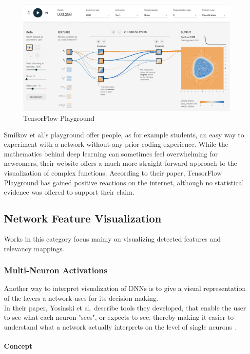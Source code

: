 \documentclass{acmsiggraph}               %
\newcommand{\paragraphbr}[1]{\paragraph{#1}\mbox{}\\}
\begin{document}
\begin{figure}
\includegraphics[width=\textwidth]{tensorflow_playground_smilkov_et_al}
\caption{TensorFlow Playground \protect\cite{Smilkov2017}}
\label{fig:tensorflow_playground}
\centering
\end{figure}

Smilkov et al.'s playground offer people, as for example students, an easy way to experiment with a network without any prior coding experience. While the mathematics behind deep learning can sometimes feel overwhelming for newcomers, their website offers a much more straight-forward approach to the visualization of complex functions. According to their paper, TensorFlow Playground has gained positive reactions on the internet, although no statistical evidence was offered to support their claim.

\subsection{Network Feature Visualization}
Works in this category focus mainly on visualizing detected features and relevancy mappings.

\subsubsection{Multi-Neuron Activations}
Another way to interpret visualization of DNNs is to give a visual representation of the layers a network uses for its decision making.\\ 
In their paper, Yosinski et al. describe tools they developed, that enable the user to see what each neuron "sees", or expects to see, thereby making it easier to understand what a network actually interprets on the level of single neurons \cite{Yosinski2015}.

\paragraphbr{Concept}
\end{document}
